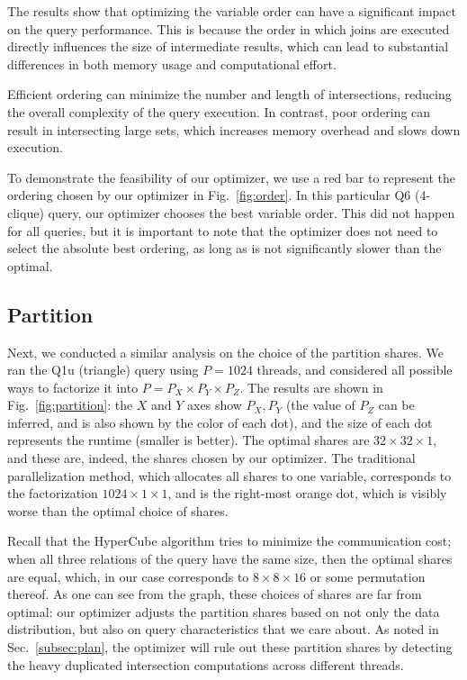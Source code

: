 The results show that optimizing the variable order can have a significant impact on the query performance. This is because the order in which joins are executed directly influences the size of intermediate results, which can lead to substantial differences in both memory usage and computational effort.

Efficient ordering can minimize the number and length of intersections, reducing the overall complexity of the query execution. In contrast, poor ordering can result in intersecting large sets, which increases memory overhead and slows down execution.

To demonstrate the feasibility of our optimizer, we use a red bar to represent the ordering chosen by our optimizer in Fig.~\ref{fig:order}. In this particular Q6 (4-clique) query, our optimizer chooses the best variable order.  This did not happen for all queries, but it is important to note that the optimizer does not need to select the absolute best ordering, as long as is not significantly slower than the optimal.  

\subsection{Partition}

Next, we conducted a similar analysis on the choice of the partition shares.  We ran the Q1u (triangle) query using $P=1024$ threads, and considered all possible ways to factorize it into $P = P_X \times P_Y \times P_Z$.  The results are shown in Fig.~\ref{fig:partition}: the $X$ and $Y$ axes show $P_X, P_Y$ (the value of $P_Z$ can be inferred, and is also shown by the color of each dot), and the size of each dot represents the runtime (smaller is better).  The optimal shares are $32 \times 32 \times 1$, and these are, indeed, the shares chosen by our optimizer.  The traditional parallelization method, which allocates all shares to one variable, corresponds to the factorization $1024 \times 1 \times 1$, and is the right-most orange dot, which is visibly worse than the optimal choice of shares.  

Recall that the HyperCube algorithm tries to minimize the communication cost; when all three relations of the query have the same size, then the optimal shares are equal, which, in our case corresponds to $8 \times 8 \times 16$ or some permutation thereof.  As one can see from the graph, these choices of shares are far from optimal: our optimizer adjusts the partition shares based on not only the data distribution, but also on query characteristics that we care about. As noted in Sec.~\ref{subsec:plan}, the optimizer will rule out these partition shares by detecting the heavy duplicated intersection computations across different threads.

